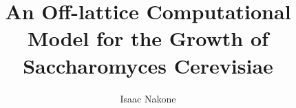 \documentclass[published]{uofathesis}
\title{An Off-lattice Computational Model for the Growth of Saccharomyces Cerevisiae}
\author{Isaac Nakone}
\begin{document}
\frontmatter
\maketitle

\tableofcontents
\listoftables
\listoffigures

\makedeclaration




\mainmatter








\begin{appendices}
\renewcommand{\thesection}{A.\arabic{section}}
 
\end{appendices}

\backmatter
\nocite{*} %
\end{document}
